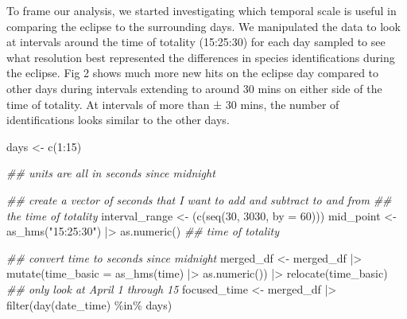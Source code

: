 \documentclass[
  letterpaper,
  DIV=11,
  numbers=noendperiod]{scrartcl}
\newenvironment{Shaded}{\begin{snugshade}}{\end{snugshade}}
\newcommand{\AttributeTok}[1]{\textcolor[rgb]{0.40,0.45,0.13}{#1}}
\newcommand{\DecValTok}[1]{\textcolor[rgb]{0.68,0.00,0.00}{#1}}
\newcommand{\DocumentationTok}[1]{\textcolor[rgb]{0.37,0.37,0.37}{\textit{#1}}}
\newcommand{\FunctionTok}[1]{\textcolor[rgb]{0.28,0.35,0.67}{#1}}
\newcommand{\NormalTok}[1]{\textcolor[rgb]{0.00,0.23,0.31}{#1}}
\newcommand{\OtherTok}[1]{\textcolor[rgb]{0.00,0.23,0.31}{#1}}
\newcommand{\SpecialCharTok}[1]{\textcolor[rgb]{0.37,0.37,0.37}{#1}}
\newcommand{\StringTok}[1]{\textcolor[rgb]{0.13,0.47,0.30}{#1}}
\begin{document}
\linespread{2}

To frame our analysis, we started investigating which temporal scale is
useful in comparing the eclipse to the surrounding days. We manipulated
the data to look at intervals around the time of totality (15:25:30) for
each day sampled to see what resolution best represented the differences
in species identifications during the eclipse. Fig 2 shows much more new
hits on the eclipse day compared to other days during intervals
extending to around 30 mins on either side of the time of totality. At
intervals of more than ± 30 mins, the number of identifications looks
similar to the other days.

\linespread{0.9}

\begin{Shaded}
\begin{Highlighting}[]
\NormalTok{days }\OtherTok{\textless{}{-}} \FunctionTok{c}\NormalTok{(}\DecValTok{1}\SpecialCharTok{:}\DecValTok{15}\NormalTok{)}

\DocumentationTok{\#\# units are all in seconds since midnight}

\DocumentationTok{\#\# create a vector of seconds that I want to add and subtract to and from}
\DocumentationTok{\#\# the time of totality}
\NormalTok{interval\_range }\OtherTok{\textless{}{-}}\NormalTok{ (}\FunctionTok{c}\NormalTok{(}\FunctionTok{seq}\NormalTok{(}\DecValTok{30}\NormalTok{, }\DecValTok{3030}\NormalTok{, }\AttributeTok{by =} \DecValTok{60}\NormalTok{)))}
\NormalTok{mid\_point }\OtherTok{\textless{}{-}} \FunctionTok{as\_hms}\NormalTok{(}\StringTok{"15:25:30"}\NormalTok{) }\SpecialCharTok{|\textgreater{}} \FunctionTok{as.numeric}\NormalTok{() }\DocumentationTok{\#\# time of totality}

\DocumentationTok{\#\# convert time to seconds since midnight}
\NormalTok{merged\_df }\OtherTok{\textless{}{-}}\NormalTok{ merged\_df }\SpecialCharTok{|\textgreater{}} \FunctionTok{mutate}\NormalTok{(}\AttributeTok{time\_basic =} \FunctionTok{as\_hms}\NormalTok{(time) }\SpecialCharTok{|\textgreater{}} \FunctionTok{as.numeric}\NormalTok{()) }\SpecialCharTok{|\textgreater{}}
  \FunctionTok{relocate}\NormalTok{(time\_basic)}
\DocumentationTok{\#\# only look at April 1 through 15}
\NormalTok{focused\_time }\OtherTok{\textless{}{-}}\NormalTok{ merged\_df }\SpecialCharTok{|\textgreater{}} \FunctionTok{filter}\NormalTok{(}\FunctionTok{day}\NormalTok{(date\_time) }\SpecialCharTok{\%in\%}\NormalTok{ days)}
\end{Highlighting}
\end{Shaded}
\end{document}
